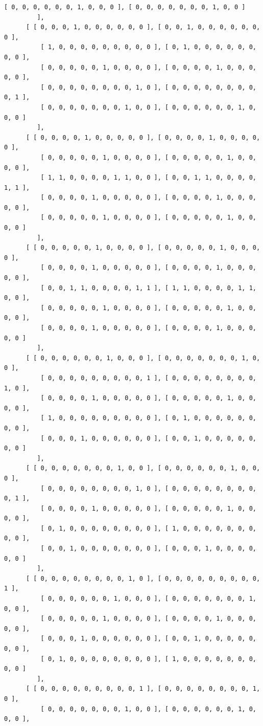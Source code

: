\documentclass[a4paper, 10pt]{book}
\theoremstyle{definition}
\numberwithin{equation}{chapter}
\begin{document}
\begin{appendices}
\begin{enumerate}
\begin{lstlisting}[numbers=none]
          [ 0, 0, 0, 0, 0, 0, 1, 0, 0, 0 ], [ 0, 0, 0, 0, 0, 0, 0, 1, 0, 0 ] 
         ], 
      [ [ 0, 0, 0, 1, 0, 0, 0, 0, 0, 0 ], [ 0, 0, 1, 0, 0, 0, 0, 0, 0, 0 ], 
          [ 1, 0, 0, 0, 0, 0, 0, 0, 0, 0 ], [ 0, 1, 0, 0, 0, 0, 0, 0, 0, 0 ],
          [ 0, 0, 0, 0, 0, 1, 0, 0, 0, 0 ], [ 0, 0, 0, 0, 1, 0, 0, 0, 0, 0 ],
          [ 0, 0, 0, 0, 0, 0, 0, 0, 1, 0 ], [ 0, 0, 0, 0, 0, 0, 0, 0, 0, 1 ],
          [ 0, 0, 0, 0, 0, 0, 0, 1, 0, 0 ], [ 0, 0, 0, 0, 0, 0, 1, 0, 0, 0 ] 
         ], 
      [ [ 0, 0, 0, 0, 1, 0, 0, 0, 0, 0 ], [ 0, 0, 0, 0, 1, 0, 0, 0, 0, 0 ], 
          [ 0, 0, 0, 0, 0, 1, 0, 0, 0, 0 ], [ 0, 0, 0, 0, 0, 1, 0, 0, 0, 0 ],
          [ 1, 1, 0, 0, 0, 0, 1, 1, 0, 0 ], [ 0, 0, 1, 1, 0, 0, 0, 0, 1, 1 ],
          [ 0, 0, 0, 0, 1, 0, 0, 0, 0, 0 ], [ 0, 0, 0, 0, 1, 0, 0, 0, 0, 0 ],
          [ 0, 0, 0, 0, 0, 1, 0, 0, 0, 0 ], [ 0, 0, 0, 0, 0, 1, 0, 0, 0, 0 ] 
         ], 
      [ [ 0, 0, 0, 0, 0, 1, 0, 0, 0, 0 ], [ 0, 0, 0, 0, 0, 1, 0, 0, 0, 0 ], 
          [ 0, 0, 0, 0, 1, 0, 0, 0, 0, 0 ], [ 0, 0, 0, 0, 1, 0, 0, 0, 0, 0 ],
          [ 0, 0, 1, 1, 0, 0, 0, 0, 1, 1 ], [ 1, 1, 0, 0, 0, 0, 1, 1, 0, 0 ],
          [ 0, 0, 0, 0, 0, 1, 0, 0, 0, 0 ], [ 0, 0, 0, 0, 0, 1, 0, 0, 0, 0 ],
          [ 0, 0, 0, 0, 1, 0, 0, 0, 0, 0 ], [ 0, 0, 0, 0, 1, 0, 0, 0, 0, 0 ] 
         ], 
      [ [ 0, 0, 0, 0, 0, 0, 1, 0, 0, 0 ], [ 0, 0, 0, 0, 0, 0, 0, 1, 0, 0 ], 
          [ 0, 0, 0, 0, 0, 0, 0, 0, 0, 1 ], [ 0, 0, 0, 0, 0, 0, 0, 0, 1, 0 ],
          [ 0, 0, 0, 0, 1, 0, 0, 0, 0, 0 ], [ 0, 0, 0, 0, 0, 1, 0, 0, 0, 0 ],
          [ 1, 0, 0, 0, 0, 0, 0, 0, 0, 0 ], [ 0, 1, 0, 0, 0, 0, 0, 0, 0, 0 ],
          [ 0, 0, 0, 1, 0, 0, 0, 0, 0, 0 ], [ 0, 0, 1, 0, 0, 0, 0, 0, 0, 0 ] 
         ], 
      [ [ 0, 0, 0, 0, 0, 0, 0, 1, 0, 0 ], [ 0, 0, 0, 0, 0, 0, 1, 0, 0, 0 ], 
          [ 0, 0, 0, 0, 0, 0, 0, 0, 1, 0 ], [ 0, 0, 0, 0, 0, 0, 0, 0, 0, 1 ],
          [ 0, 0, 0, 0, 1, 0, 0, 0, 0, 0 ], [ 0, 0, 0, 0, 0, 1, 0, 0, 0, 0 ],
          [ 0, 1, 0, 0, 0, 0, 0, 0, 0, 0 ], [ 1, 0, 0, 0, 0, 0, 0, 0, 0, 0 ],
          [ 0, 0, 1, 0, 0, 0, 0, 0, 0, 0 ], [ 0, 0, 0, 1, 0, 0, 0, 0, 0, 0 ] 
         ], 
      [ [ 0, 0, 0, 0, 0, 0, 0, 0, 1, 0 ], [ 0, 0, 0, 0, 0, 0, 0, 0, 0, 1 ], 
          [ 0, 0, 0, 0, 0, 0, 1, 0, 0, 0 ], [ 0, 0, 0, 0, 0, 0, 0, 1, 0, 0 ],
          [ 0, 0, 0, 0, 0, 1, 0, 0, 0, 0 ], [ 0, 0, 0, 0, 1, 0, 0, 0, 0, 0 ],
          [ 0, 0, 0, 1, 0, 0, 0, 0, 0, 0 ], [ 0, 0, 1, 0, 0, 0, 0, 0, 0, 0 ],
          [ 0, 1, 0, 0, 0, 0, 0, 0, 0, 0 ], [ 1, 0, 0, 0, 0, 0, 0, 0, 0, 0 ] 
         ], 
      [ [ 0, 0, 0, 0, 0, 0, 0, 0, 0, 1 ], [ 0, 0, 0, 0, 0, 0, 0, 0, 1, 0 ], 
          [ 0, 0, 0, 0, 0, 0, 0, 1, 0, 0 ], [ 0, 0, 0, 0, 0, 0, 1, 0, 0, 0 ],

\end{lstlisting}
\end{enumerate}
\end{appendices}
\end{document}
